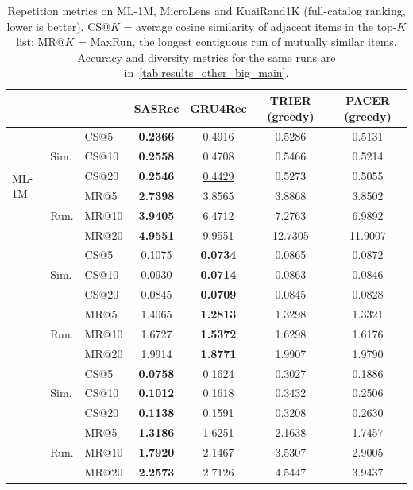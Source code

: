 \begin{table}[t]
\centering
\caption{Repetition metrics on ML-1M, MicroLens and KuaiRand1K (full-catalog ranking, lower is better).
CS@$K$ = average cosine similarity of adjacent items in the top-$K$ list;
MR@$K$ = MaxRun, the longest contiguous run of mutually similar items.
Accuracy and diversity metrics for the same runs are in~\cref{tab:results_other_big_main}.}
\label{tab:results_other_big_consec}
\begin{tabular}{lllcccc}
\toprule
& & & SASRec & GRU4Rec & TRIER (greedy) & PACER (greedy) \\
\midrule
\multirow{6}{*}{ML-1M}
 & \multirow{3}{*}{Sim.}
 & CS@5  & \textbf{0.2366} & 0.4916 & 0.5286 & 0.5131 \\
 & & CS@10 & \textbf{0.2558} & 0.4708 & 0.5466 & 0.5214 \\
 & & CS@20 & \textbf{0.2546} & \underline{0.4429} & 0.5273 & 0.5055 \\
 & \multirow{3}{*}{Run.}
 & MR@5  & \textbf{2.7398} & 3.8565 & 3.8868 & 3.8502 \\
 & & MR@10 & \textbf{3.9405} & 6.4712 & 7.2763 & 6.9892 \\
 & & MR@20 & \textbf{4.9551} & \underline{9.9551} & 12.7305 & 11.9007 \\
\addlinespace[0.4em]
\multirow{6}{*}{MicroLens}
 & \multirow{3}{*}{Sim.}
 & CS@5  & 0.1075 & \textbf{0.0734} & 0.0865 & 0.0872 \\
 & & CS@10 & 0.0930 & \textbf{0.0714} & 0.0863 & 0.0846 \\
 & & CS@20 & 0.0845 & \textbf{0.0709} & 0.0845 & 0.0828 \\
 & \multirow{3}{*}{Run.}
 & MR@5  & 1.4065 & \textbf{1.2813} & 1.3298 & 1.3321 \\
 & & MR@10 & 1.6727 & \textbf{1.5372} & 1.6298 & 1.6176 \\
 & & MR@20 & 1.9914 & \textbf{1.8771} & 1.9907 & 1.9790 \\
\addlinespace[0.4em]
\multirow{6}{*}{KuaiRand1K}
 & \multirow{3}{*}{Sim.}
 & CS@5  & \textbf{0.0758} & 0.1624 & 0.3027 & 0.1886 \\
 & & CS@10 & \textbf{0.1012} & 0.1618 & 0.3432 & 0.2506 \\
 & & CS@20 & \textbf{0.1138} & 0.1591 & 0.3208 & 0.2630 \\
 & \multirow{3}{*}{Run.}
 & MR@5  & \textbf{1.3186} & 1.6251 & 2.1638 & 1.7457 \\
 & & MR@10 & \textbf{1.7920} & 2.1467 & 3.5307 & 2.9005 \\
 & & MR@20 & \textbf{2.2573} & 2.7126 & 4.5447 & 3.9437 \\
\bottomrule
\end{tabular}
\end{table}
